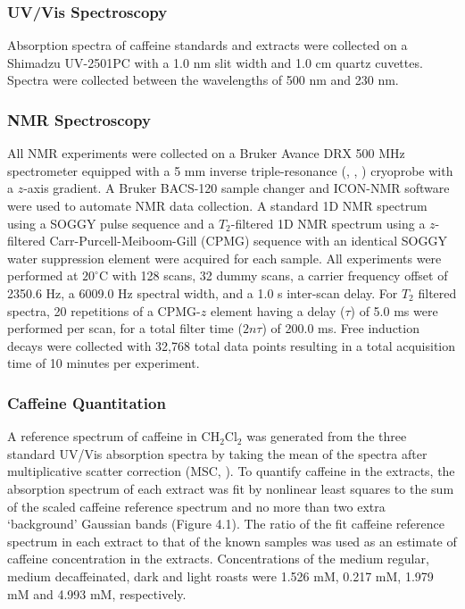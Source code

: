\subsubsection{UV/Vis Spectroscopy}

\begin{doublespace}
Absorption spectra of caffeine standards and extracts were collected on a
Shimadzu UV-2501PC with a 1.0 nm slit width and 1.0 cm quartz cuvettes. Spectra
were collected between the wavelengths of 500 nm and 230 nm.
\end{doublespace}

\subsubsection{NMR Spectroscopy}

\begin{doublespace}
All NMR experiments were collected on a Bruker Avance DRX 500 MHz spectrometer
equipped with a 5 mm inverse triple-resonance (\hnmr{}, \cnmr{}, \nnmr{})
cryoprobe with a $z$-axis gradient. A Bruker BACS-120 sample changer and
ICON-NMR software were used to automate NMR data collection. A standard 1D
\hnmr{} NMR spectrum using a SOGGY pulse sequence
\cite{hwang:jmr1995,nguyen:jmr2007} and a $T_2$-filtered 1D \hnmr{} NMR
spectrum using a $z$-filtered Carr-Purcell-Meiboom-Gill (CPMG) sequence
\cite{rastrelli:jacs2009} with an identical SOGGY water suppression element
were acquired for each sample. All experiments were performed at $20^\circ$C
with 128 scans, 32 dummy scans, a carrier frequency offset of 2350.6 Hz, a
6009.0 Hz spectral width, and a 1.0 s inter-scan delay. For $T_2$ filtered
spectra, 20 repetitions of a CPMG-$z$ element having a delay ($\tau$) of 5.0
ms were performed per scan, for a total filter time ($2n\tau$) of 200.0 ms.
Free induction decays were collected with 32,768 total data points resulting
in a total acquisition time of 10 minutes per experiment.
\end{doublespace}

\subsubsection{Caffeine Quantitation}

\begin{doublespace}
A reference spectrum of caffeine in CH$_2$Cl$_2$ was generated from the three
standard UV/Vis absorption spectra by taking the mean of the spectra after
multiplicative scatter correction (MSC, \cite{fearn:cils2009}). To quantify
caffeine in the extracts, the absorption spectrum of each extract was fit by
nonlinear least squares \cite{marquardt:jsiam1963} to the sum of the scaled
caffeine reference spectrum and no more than two extra `background' Gaussian
bands (Figure 4.1). The ratio of the fit caffeine reference spectrum in each
extract to that of the known samples was used as an estimate of caffeine
concentration in the extracts. Concentrations of the medium regular, medium
decaffeinated, dark and light roasts were 1.526 mM, 0.217 mM, 1.979 mM and
4.993 mM, respectively.
\end{doublespace}

